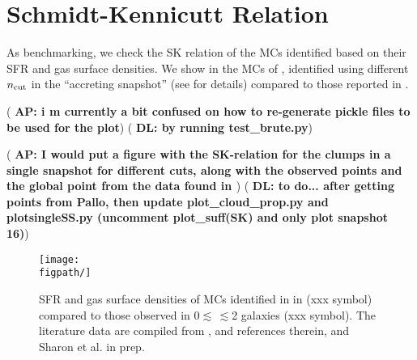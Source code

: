 \documentclass[iop]{emulateapj} %
\newcommand{\AP}[1]{({\bf \color{apcolor} AP: #1})}
\newcommand{\DL}[1]{({\bf \color{dlcolor} DL: #1})}
\begin{document}





\appendix
\section{Schmidt-Kennicutt Relation}
As benchmarking, we check the SK relation of the MCs identified based on their SFR and gas surface densities.
We show in  the MCs of \flower, identified using different $n_{\rm cut}$ in the ``accreting snapshot'' 
(see  for details) compared to those reported in \obs. 

\AP{i m currently a bit confused on how to re-generate pickle files to be used for the plot}
\DL{by running test\_brute.py}

\AP{I would put a figure with the SK-relation for the clumps in a single snapshot for different cuts, along with the observed points and the global \flower point from the data found in \citet{Pallottini17b}}
\DL{to do... after getting points from Pallo, then update plot\_cloud\_prop.py and plotsingleSS.py (uncomment plot\_suff(SK) and only plot snapshot 16)}


\begin{figure*}[htbp]
\centering
\texttt{[image: \\figpath/]}
\caption{
SFR and gas surface densities of MCs identified in \flower in  (xxx symbol) compared to those 
observed in 0$\lesssim$\,\z$\lesssim$2 galaxies (xxx symbol). 
The literature data are compiled from \citealt{Leroy13a, Genzel13a, Sharon13a, Hodge15a}, \citealt{Pallottini17b} and references therein, and Sharon et al. in prep.
\label{fig:sk}}
\end{figure*}




%

%
\end{document}
